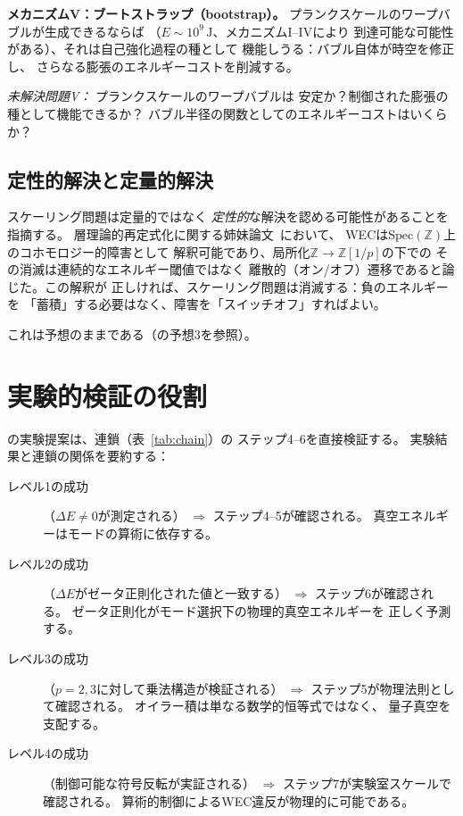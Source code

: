 \documentclass[11pt,a4paper]{article}
\newcommand{\Spec}{\mathrm{Spec}}
\newcommand{\Zp}{\mathbb{Z}[1/p]}
\begin{document}
\textbf{メカニズムV：ブートストラップ（bootstrap）。}
プランクスケールのワープバブルが生成できるならば
（$E \sim 10^9\,\mathrm{J}$、メカニズムI--IVにより
到達可能な可能性がある）、それは自己強化過程の種として
機能しうる：バブル自体が時空を修正し、
さらなる膨張のエネルギーコストを削減する。

\textit{未解決問題V：} プランクスケールのワープバブルは
安定か？制御された膨張の種として機能できるか？
バブル半径の関数としてのエネルギーコストはいくらか？

\subsection{定性的解決と定量的解決}

スケーリング問題は定量的ではなく
\emph{定性的}な解決を認める可能性があることを指摘する。
層理論的再定式化に関する姉妹論文~\cite{paper_B}において、
WECは$\Spec(\mathbb{Z})$上のコホモロジー的障害として
解釈可能であり、局所化$\mathbb{Z} \to \Zp$の下での
その消滅は連続的なエネルギー閾値ではなく
離散的（オン/オフ）遷移であると論じた。この解釈が
正しければ、スケーリング問題は消滅する：負のエネルギーを
「蓄積」する必要はなく、障害を「スイッチオフ」すればよい。

これは予想のままである（\cite{paper_B}の予想3を参照）。

\section{実験的検証の役割}
\label{sec:experiment}

\cite{paper_A}の実験提案は、連鎖（表~\ref{tab:chain}）の
ステップ4--6を直接検証する。
実験結果と連鎖の関係を要約する：

\begin{description}
  \item[レベル1の成功] （$\Delta E \neq 0$が測定される）
    $\Rightarrow$ ステップ4--5が確認される。
    真空エネルギーはモードの算術に依存する。

  \item[レベル2の成功] （$\Delta E$がゼータ正則化された値と一致する）
    $\Rightarrow$ ステップ6が確認される。
    ゼータ正則化がモード選択下の物理的真空エネルギーを
    正しく予測する。

  \item[レベル3の成功] （$p=2,3$に対して乗法構造が検証される）
    $\Rightarrow$ ステップ5が物理法則として確認される。
    オイラー積は単なる数学的恒等式ではなく、
    量子真空を支配する。

  \item[レベル4の成功] （制御可能な符号反転が実証される）
    $\Rightarrow$ ステップ7が実験室スケールで確認される。
    算術的制御によるWEC違反が物理的に可能である。
\end{description}
\end{document}
